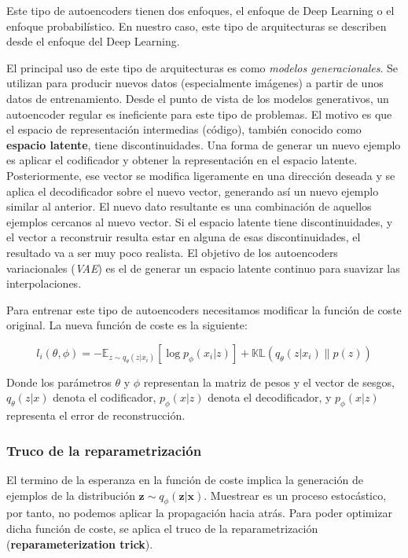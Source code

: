 \documentclass[
  12pt,
  a4paperpaper,
]{report}
\begin{document}
Este tipo de autoencoders tienen dos enfoques, el enfoque de Deep
Learning o el enfoque probabilístico. En nuestro caso, este tipo de
arquitecturas se describen desde el enfoque del Deep Learning.

El principal uso de este tipo de arquitecturas es como \emph{modelos
generacionales}. Se utilizan para producir nuevos datos (especialmente
imágenes) a partir de unos datos de entrenamiento. Desde el punto de
vista de los modelos generativos, un autoencoder regular es ineficiente
para este tipo de problemas. El motivo es que el espacio de
representación intermedias (código), también conocido como
\textbf{espacio latente}, tiene discontinuidades. Una forma de generar
un nuevo ejemplo es aplicar el codificador y obtener la representación
en el espacio latente. Posteriormente, ese vector se modifica
ligeramente en una dirección deseada y se aplica el decodificador sobre
el nuevo vector, generando así un nuevo ejemplo similar al anterior. El
nuevo dato resultante es una combinación de aquellos ejemplos cercanos
al nuevo vector. Si el espacio latente tiene discontinuidades, y el
vector a reconstruir resulta estar en alguna de esas discontinuidades,
el resultado va a ser muy poco realista. El objetivo de los autoencoders
variacionales (\emph{VAE}) es el de generar un espacio latente continuo
para suavizar las interpolaciones.

Para entrenar este tipo de autoencoders necesitamos modificar la función
de coste original. La nueva función de coste es la siguiente:

\[l_{i}(\theta, \phi)=-\mathbb{E}_{z \sim q_{\theta}\left(z | x_{i}\right)}\left[\log p_{\phi}\left(x_{i} | z\right)\right]+\mathbb{K} \mathbb{L}\left(q_{\theta}\left(z | x_{i}\right) \| p(z)\right)\]

Donde los parámetros \(\theta\) y \(\phi\) representan la matriz de
pesos y el vector de sesgos, \(q_{\theta}(z | x)\) denota el
codificador, \(p_{\phi}(x | z)\) denota el decodificador, y
\(p_{\phi}(x | z)\) representa el error de reconstrucción.

\hypertarget{truco-de-la-reparametrizaciuxf3n}{%
\subsubsection{Truco de la
reparametrización}\label{truco-de-la-reparametrizaciuxf3n}}

El termino de la esperanza en la función de coste implica la generación
de ejemplos de la distribución
\(\mathbf{z} \sim q_{\phi}(\mathbf{z} | \mathbf{x})\). Muestrear es un
proceso estocástico, por tanto, no podemos aplicar la propagación hacia
atrás. Para poder optimizar dicha función de coste, se aplica el truco
de la reparametrización (\textbf{reparameterization trick}).
\end{document}
